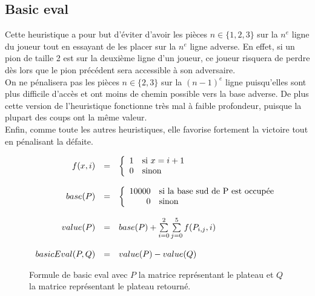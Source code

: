 \subsection{Basic eval}

	Cette heuristique a pour but d'éviter d'avoir les pièces $n \in \{1,2,3\}$ sur la $n^{e}$ ligne du joueur tout
	en essayant de les placer sur la $n^{e}$ ligne adverse. En effet, si un pion de taille 2 est sur la deuxième
	ligne d'un joueur, ce joueur risquera de perdre dès lors que le pion précédent sera accessible à son adversaire. \\

	On ne pénalisera pas les pièces $n \in \{2,3\}$ sur la $(n-1)^{e}$ ligne puisqu'elles sont plus difficile
	d'accès et ont moins de chemin possible vers la base adverse. De plus cette version de l'heuristique fonctionne %
	très mal à faible profondeur, puisque la plupart des coups ont la même valeur. \\

	Enfin, comme toute les autres heuristiques, elle favorise fortement la victoire tout en pénalisant la défaite.

	\begin{figure}[h!]
	\[
		\begin{array}{r c l}
			f(x,i) &= &
			\left\{
			\begin{array}{r l}
				1 & $si$~ x = i + 1 \\
				0 & $sinon$\\
			\end{array}
			\right. \\

			&& \\

			base(P) &= &
			\left\{
			\begin{array}{r l}
				10000 & $si la base sud de P est occupée$ \\
				0 & $sinon$ \\
			\end{array}
			\right. \\

			&& \\

			value(P) &=&  base(P) + \sum\limits_{i=0}^{2} \sum\limits_{j=0}^{5} f(P_{i,j},i) \\

			&& \\

			basicEval(P,Q) &=& value(P) - value(Q)\\
		\end{array}
	\]
	\caption[Formule de basic eval]{Formule de basic eval avec $P$ la matrice
	représentant le plateau et $Q$ la matrice représentant le plateau retourné.}
	\label{fig:formula_basic_eval}
	\end{figure}

